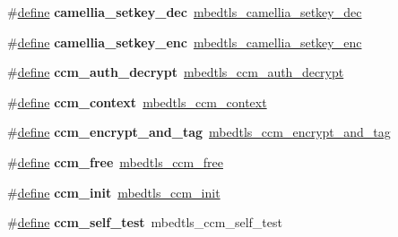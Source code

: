 \begin{DoxyCompactItemize}
\item 
\mbox{\label{compat-1_83_8h_a8fc022667ab8f27ff4e91fa5fba8ce89}} 
\#\hyperlink{structdefine}{define} {\bfseries camellia\+\_\+setkey\+\_\+dec}~\hyperlink{camellia_8h_a4feb62fea75a091ea9af734a8a83f9fc}{mbedtls\+\_\+camellia\+\_\+setkey\+\_\+dec}
\item 
\mbox{\label{compat-1_83_8h_aebc581aaf8cb7f8eeaced20d3dac0cdf}} 
\#\hyperlink{structdefine}{define} {\bfseries camellia\+\_\+setkey\+\_\+enc}~\hyperlink{camellia_8h_a206655fc2e6cd1a511766d96a0e0f1cd}{mbedtls\+\_\+camellia\+\_\+setkey\+\_\+enc}
\item 
\mbox{\label{compat-1_83_8h_ae060fa35b5593a8369dde4b76816e905}} 
\#\hyperlink{structdefine}{define} {\bfseries ccm\+\_\+auth\+\_\+decrypt}~\hyperlink{ccm_8h_a8dc9dfe246064185498f005d8bf22622}{mbedtls\+\_\+ccm\+\_\+auth\+\_\+decrypt}
\item 
\mbox{\label{compat-1_83_8h_a32163b6be4644639caeebd795da3f1c7}} 
\#\hyperlink{structdefine}{define} {\bfseries ccm\+\_\+context}~\hyperlink{structmbedtls__ccm__context}{mbedtls\+\_\+ccm\+\_\+context}
\item 
\mbox{\label{compat-1_83_8h_a2ab6ac45d170fd011b6bcbf831ca3096}} 
\#\hyperlink{structdefine}{define} {\bfseries ccm\+\_\+encrypt\+\_\+and\+\_\+tag}~\hyperlink{ccm_8h_a64de697edfefbff94d7eb0d9a8de926f}{mbedtls\+\_\+ccm\+\_\+encrypt\+\_\+and\+\_\+tag}
\item 
\mbox{\label{compat-1_83_8h_ad05a53b9a3ba72b556a36106ff647484}} 
\#\hyperlink{structdefine}{define} {\bfseries ccm\+\_\+free}~\hyperlink{ccm_8h_a2bd8130a83c6633a4dfd61b181cdabac}{mbedtls\+\_\+ccm\+\_\+free}
\item 
\mbox{\label{compat-1_83_8h_ada88cb9aeba11f0c97f2d1ea9705622c}} 
\#\hyperlink{structdefine}{define} {\bfseries ccm\+\_\+init}~\hyperlink{ccm_8h_abaeb0629dfac72016fda58a4f7870040}{mbedtls\+\_\+ccm\+\_\+init}
\item 
\mbox{\label{compat-1_83_8h_ada563027f4e1f329f962ce17f642d461}} 
\#\hyperlink{structdefine}{define} {\bfseries ccm\+\_\+self\+\_\+test}~mbedtls\+\_\+ccm\+\_\+self\+\_\+test

\end{DoxyCompactItemize}
